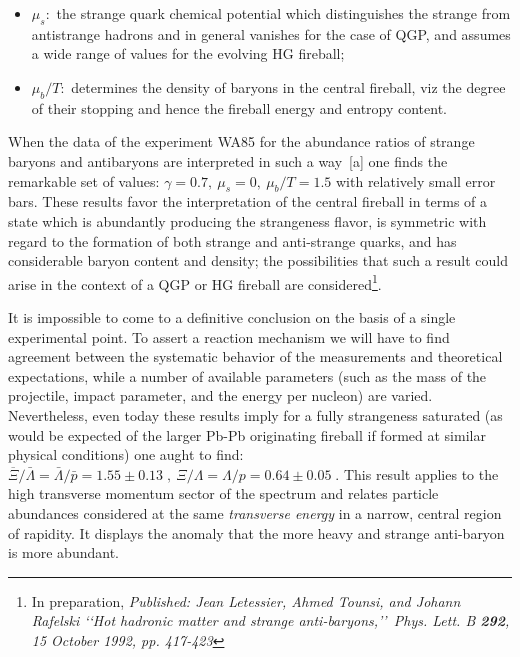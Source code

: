 \begin{mdframed}[linecolor=gray,roundcorner=12pt,backgroundcolor=Dandelion!15,linewidth=1pt,leftmargin=0cm,rightmargin=0cm,topline=true,bottomline=true,skipabove=12pt]
\begin{itemize}
\item $\mu_s:$ the strange quark chemical potential which distinguishes the strange from antistrange hadrons and in general vanishes for the case of QGP, and assumes a wide range of values for the evolving HG fireball;
\item $\mu_b/T:$ determines the density of baryons in the central fireball, viz the degree of their stopping and hence the fireball energy and entropy content.
\end{itemize}
When the data of the experiment WA85 for the abundance ratios of strange baryons and antibaryons are interpreted in such a way~[a] one finds the remarkable set of values: $\gamma=0.7,\ \mu_s=0,\ \mu_b/T=1.5$ with relatively small error bars. These results favor the interpretation of the central fireball in terms of a state which is abundantly producing the strangeness flavor, is symmetric with regard to the formation of both strange and anti-strange quarks, and has considerable baryon content and density; the possibilities that such a result could arise in the context of a QGP or HG fireball are considered\footnote{In preparation, \textit{Published: Jean Letessier, Ahmed Tounsi, and Johann Rafelski \lq\lq Hot hadronic matter and strange anti-baryons,\rq\rq\ Phys. Lett. B \textbf{292}, 15 October 1992, pp. 417-423}}. 
 
It is impossible to come to a definitive conclusion on the basis of a single experimental point. To assert a reaction mechanism we will have to find agreement between the systematic behavior of the measurements and theoretical expectations, while a number of available parameters (such as the mass of the projectile, impact parameter, and the energy per nucleon) are varied. Nevertheless, even today these results imply for a fully strangeness saturated (as would be expected of the larger Pb-Pb originating fireball if formed at similar physical conditions) one aught
to find:
${\overline \Xi}/{\bar \Lambda}={\bar \Lambda}/{\bar p}=1.55\pm0.13 \;,\ 
\Xi/\Lambda=\Lambda/p=0.64\pm0.05 \;. $ 
This result applies to the high transverse momentum sector of the spectrum and relates particle abundances considered at the same {\it transverse energy} in a narrow, central region of rapidity. It displays the anomaly that the more heavy and strange anti-baryon is more abundant. 
\end{mdframed}


